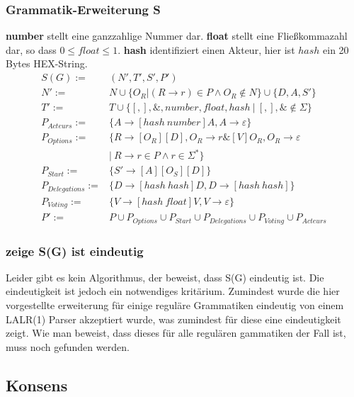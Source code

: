 \documentclass[a4paper,12pt]{report}
\begin{document}
\subsubsection*{Grammatik-Erweiterung S}

\textbf{number} stellt eine ganzzahlige Nummer dar. \textbf{float}
stellt eine Fließkommazahl dar, so dass $0\leq float \leq 1$. \textbf{hash} identifiziert einen Akteur, hier ist $hash$ ein 20 Bytes HEX-String. \\

\begin{align}
  S(G) :=& (N', T', S', P') \\
  N' :=& N \cup \{ O_R | (R\rightarrow r)\in P\land O_R \notin N\}\cup\{D, A, S'\}\\
  T' :=& T \cup \{[ , ], \&, number, float, hash\ |\ [,],\& \notin \Sigma \}\\
  P_{Acteurs} :=& \{A\rightarrow[hash\ number]A,A\rightarrow \varepsilon\} \\
  P_{Options} :=& \{R \rightarrow [O_R][D], O_R \rightarrow r\& [V] O_R, O_R \rightarrow \varepsilon \ \nonumber\\
  &\vert\ R\rightarrow r\in P \land r\in \Sigma^*\} \\
  P_{Start} :=& \{S'\rightarrow [A][O_S][D]\} \\
  P_{Delegations} :=& \{D\rightarrow [hash\ hash]D,D\rightarrow [hash\ hash]\} \\
  P_{Voting} :=& \{V\rightarrow [hash\ float]V, V \rightarrow \varepsilon\} \\
  P' :=& P
  \cup P_{Options} 
  \cup P_{Start} 
  \cup P_{Delegations} 
  \cup P_{Voting} 
  \cup P_{Acteurs}
\end{align}


\subsubsection*{zeige S(G) ist eindeutig}
Leider gibt es kein Algorithmus, der beweist, dass S(G) eindeutig ist. Die eindeutigkeit ist jedoch ein notwendiges kritärium. Zumindest wurde die hier vorgestellte erweiterung für einige reguläre Grammatiken eindeutig von einem LALR(1) Parser akzeptiert wurde, was zumindest für diese eine eindeutigkeit zeigt. Wie man beweist, dass dieses für alle regulären gammatiken der Fall ist, muss noch gefunden werden.

\subsection{Konsens}
\end{document}
